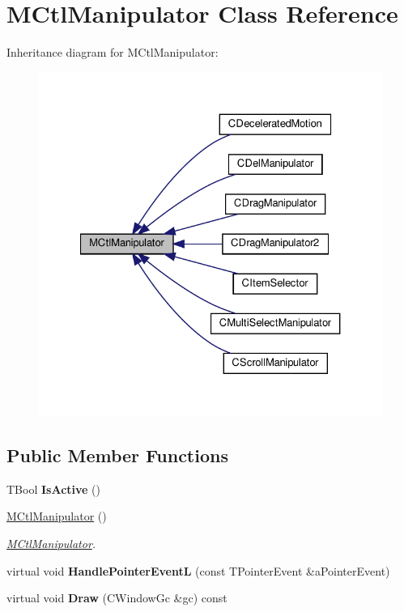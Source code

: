 \hypertarget{classMCtlManipulator}{}\section{M\+Ctl\+Manipulator Class Reference}
\label{classMCtlManipulator}


Inheritance diagram for M\+Ctl\+Manipulator\+:
\nopagebreak
\begin{figure}[H]
\begin{center}
\leavevmode
\includegraphics[width=327pt]{classMCtlManipulator__inherit__graph}
\end{center}
\end{figure}
\subsection*{Public Member Functions}
\begin{DoxyCompactItemize}
\item 
\mbox{\label{classMCtlManipulator_a5e955bea06960e9f44db70047bfce4f0}} 
T\+Bool {\bfseries Is\+Active} ()
\item 
\mbox{\label{classMCtlManipulator_aaf3d6b58180c46e34532140606db97d4}} 
\hyperlink{classMCtlManipulator_aaf3d6b58180c46e34532140606db97d4}{M\+Ctl\+Manipulator} ()
\begin{DoxyCompactList}\small\item\em \hyperlink{classMCtlManipulator}{M\+Ctl\+Manipulator}. \end{DoxyCompactList}\item 
\mbox{\label{classMCtlManipulator_a7ce0be9715912a544ee738a63f1e9e08}} 
virtual void {\bfseries Handle\+Pointer\+EventL} (const T\+Pointer\+Event \&a\+Pointer\+Event)
\item 
\mbox{\label{classMCtlManipulator_aa25d6b77b3f0b2ef8342f714d9795fbf}} 
virtual void {\bfseries Draw} (C\+Window\+Gc \&gc) const
\end{DoxyCompactItemize}
